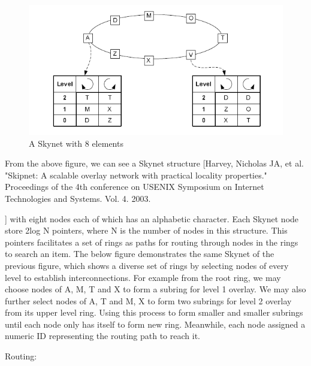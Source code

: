 \documentclass[oribibl]{llncs}
\begin{document}
\begin{figure}[here]
\center
\includegraphics[width=12cm]{images/skynet}
\caption{A Skynet with 8 elements}
\label{fig:jumplist}
\end{figure}

From the above figure, we can see a Skynet structure [Harvey, Nicholas JA, et al. "Skipnet: A scalable overlay network with practical locality properties." Proceedings of the 4th conference on USENIX Symposium on Internet Technologies and Systems. Vol. 4. 2003.

] with eight nodes each of which has an alphabetic character. Each Skynet node store 2log N pointers, where N is the number of nodes in this structure. This pointers facilitates a set of rings as paths for routing through nodes in the rings to search an item. The below figure demonstrates the same Skynet of the previous figure, which shows a diverse set of rings by selecting nodes of every level to establish interconnections. For example from the root ring, we may choose nodes of A, M, T and X to form a subring for level 1 overlay. We may also further select nodes of A, T and M, X to form two subrings for level 2 overlay from its upper level ring. Using this process to form smaller and smaller subrings until each node only has itself to form new ring. Meanwhile, each node assigned a numeric ID representing the routing path to reach it.

Routing:
\end{document}
